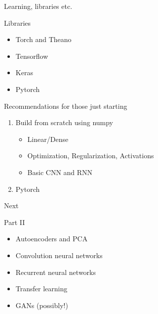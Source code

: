 \begin{frame}{Learning, libraries etc.}
\begin{block}{Libraries}
	\begin{itemize}
		\item Torch and Theano 
		\item Tensorflow  
		\item Keras
		\item Pytorch  
	\end{itemize}	
\end{block}

\begin{block}{Recommendations for those just starting}
	\begin{enumerate}
		\item Build from scratch using numpy 
		\begin{itemize}
			\item Linear/Dense 
			\item Optimization,  Regularization,  Activations 
			\item Basic CNN and RNN
		\end{itemize} 
		\item Pytorch  
	\end{enumerate}	
\end{block}
\end{frame}

\begin{frame}{Next}
	\begin{block}{Part II}
		\begin{itemize}
			\item Autoencoders and PCA 
			\item Convolution neural networks 
			\item Recurrent neural networks 
			\item Transfer learning 
			\item GANs (possibly!) 
		\end{itemize}		
	\end{block}

\end{frame}
